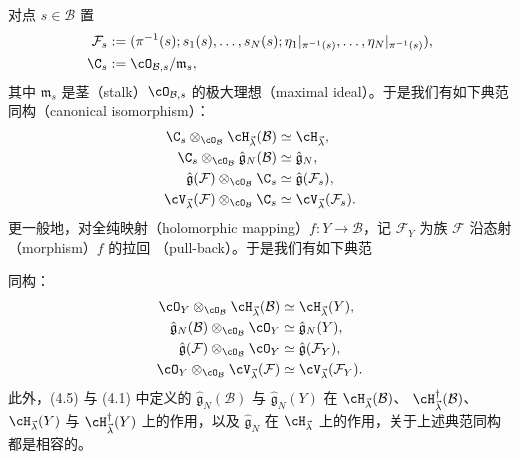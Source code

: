 \begin{lemma}[4.3]
对点 $s\in\mathcal{B}$ 置
\[
  \begin{aligned}
  \mathcal{F}_s &:= (\pi^{-1}(s);s_1(s),\dots,s_N(s);
    \eta_1|_{\pi^{-1}(s)},\dots,\eta_N|_{\pi^{-1}(s)}),\\
  \C_s &:= \cO_{\mathcal{B},s}/\mathfrak{m}_s ,
  \end{aligned}
\]
其中 $\mathfrak{m}_s$ 是茎（stalk）$\cO_{\mathcal{B},s}$ 的极大理想（maximal
ideal）。于是我们有如下典范同构（canonical isomorphism）：
\[
  \begin{aligned}
  \C_s\otimes_{\cO_\mathcal{B}}\cH_{\vec{\lambda}}(\mathcal{B})
  &\simeq \cH_{\vec{\lambda}},\\
  \C_s\otimes_{\cO_\mathcal{B}}\hat{\mathfrak{g}}_N(\mathcal{B})
  &\simeq \hat{\mathfrak{g}}_N,\\
  \hat{\mathfrak{g}}(\mathcal{F})\otimes_{\cO_\mathcal{B}}\C_s
  &\simeq \hat{\mathfrak{g}}(\mathcal{F}_s),\\
  \cV_{\vec{\lambda}}(\mathcal{F})\otimes_{\cO_\mathcal{B}}\C_s
  &\simeq \cV_{\vec{\lambda}}(\mathcal{F}_s) .
  \end{aligned}
\]
更一般地，对全纯映射（holomorphic mapping）$f:Y\to\mathcal{B}$，记
$\mathcal{F}_Y$ 为族 $\mathcal{F}$ 沿态射（morphism）$f$ 的拉回
（pull-back）。于是我们有如下典范

同构：
\[
  \begin{aligned}
  \cO_Y\otimes_{\cO_\mathcal{B}}\cH_{\vec{\lambda}}(\mathcal{B})
  &\simeq \cH_{\vec{\lambda}}(Y),\\
  \hat{\mathfrak{g}}_N(\mathcal{B})\otimes_{\cO_\mathcal{B}}\cO_Y
  &\simeq \hat{\mathfrak{g}}_N(Y),\\
  \hat{\mathfrak{g}}(\mathcal{F})\otimes_{\cO_\mathcal{B}}\cO_Y
  &\simeq \hat{\mathfrak{g}}(\mathcal{F}_Y),\\
  \cO_Y\otimes_{\cO_\mathcal{B}}\cV_{\vec{\lambda}}(\mathcal{F})
  &\simeq \cV_{\vec{\lambda}}(\mathcal{F}_Y) .
  \end{aligned}
\]
此外，(4.5) 与 (4.1) 中定义的 $\hat{\mathfrak{g}}_N(\mathcal{B})$ 与
$\hat{\mathfrak{g}}_N(Y)$ 在 $\cH_{\vec{\lambda}}(\mathcal{B})$、
$\cH_{\vec{\lambda}}^\dagger(\mathcal{B})$、$\cH_{\vec{\lambda}}(Y)$ 与
$\cH_{\vec{\lambda}}^\dagger(Y)$ 上的作用，以及 $\hat{\mathfrak{g}}_N$ 在
$\cH_{\vec{\lambda}}$ 上的作用，关于上述典范同构都是相容的。
\end{lemma}


